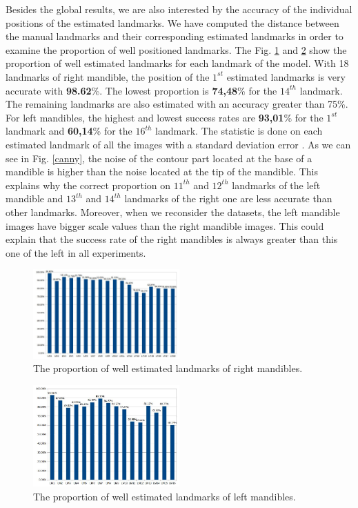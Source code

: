 \documentclass[twoside,twocolumn,10pt]{article}
\begin{document}
Besides the global results, we are also interested by the accuracy of
the individual positions of the estimated landmarks.
We have computed the distance between the manual landmarks and their
corresponding estimated landmarks in order to examine the proportion
of well positioned landmarks. The Fig. \ref{figmdresultlm} and
\ref{figmgresultlm} show the proportion of well estimated landmarks
for each landmark of the model. With 18 landmarks of right mandible,
the position of the $1^{st}$ estimated landmarks is very accurate with
\textbf{98.62}\%. The lowest proportion is \textbf{74,48}\% for the
$14^{th}$ landmark. The remaining landmarks are also estimated with an
accuracy greater than 75\%. For left mandibles, the highest and lowest success rates are
\textbf{93,01}\% for the $1^{st}$ landmark and \textbf{60,14}\% for
the $16^{th}$ landmark. The statistic is done on each estimated
landmark of all the images with a standard deviation error
\cite{bland1996statistics}. As we can see in Fig. \ref{canny}, the
noise of the contour part located at the base of a mandible is higher
than the noise located at the tip of the mandible. 
This explains why the correct proportion on $11^{th}$ and $12^{th}$
landmarks of the left mandible and $13^{th}$ and $14^{th}$ landmarks of
the right one are less accurate than other landmarks. Moreover,
when we reconsider the datasets, the left mandible images have bigger
scale values than the right mandible images. This could explain that the
success rate of the right mandibles is always greater than this one of the left
in all experiments.

\begin{figure}[htb]
    \centering
    \includegraphics[width=0.5\textwidth]{./images/md_chartlms}
    \caption{The proportion of well estimated landmarks of right mandibles.}
    \label{figmdresultlm}
\end{figure}
\begin{figure}[htb]
    \centering
    \includegraphics[width=0.5\textwidth]{./images/mg_chartlms}
    \caption{The proportion of well estimated landmarks of left mandibles.}
    \label{figmgresultlm}
\end{figure}
\end{document}
